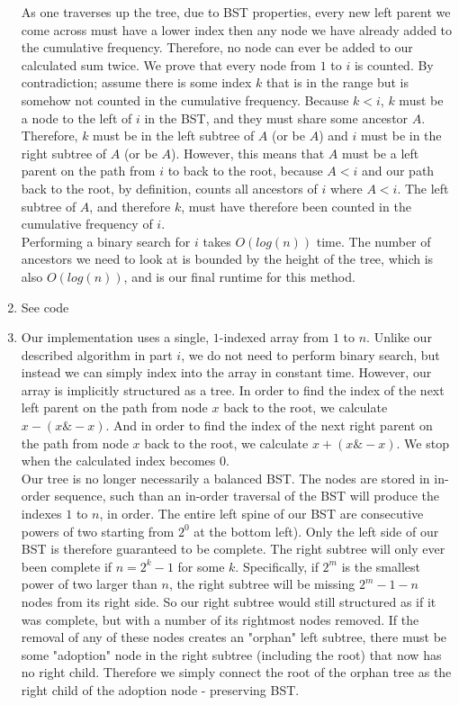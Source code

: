 \documentclass{article}
\theoremstyle{casestyle}
\begin{document}
\begin{enumerate}[i]
  As one traverses up the tree, due to BST properties, every new left parent we come across must have a lower index then any node we have already added to the cumulative frequency. Therefore, no node can ever be added to our calculated sum twice. We prove that every node from $1$ to $i$ is counted. By contradiction; assume there is some index $k$ that is in the range but is somehow not counted in the cumulative frequency. Because $k < i$, $k$ must be a node to the left of $i$ in the BST, and they must share some ancestor $A$. Therefore, $k$ must be in the left subtree of $A$ (or be $A$) and $i$ must be in the right subtree of $A$ (or be $A$). However, this means that $A$ must be a left parent on the path from $i$ to back to the root, because $A < i$ and our path back to the root, by definition, counts all ancestors of $i$ where $ A < i$. The left subtree of $A$, and therefore $k$, must have therefore been counted in the cumulative frequency of $i$.\\

  Performing a binary search for $i$ takes $O(log(n))$ time. The number of ancestors we need to look at is bounded by the height of the tree, which is also $O(log(n))$, and is our final runtime for this method.

\item
  See code

\item
  Our implementation uses a single, $1$-indexed array from $1$ to $n$. Unlike our described algorithm in part $i$, we do not need to perform binary search, but instead we can simply index into the array in constant time. However, our array is implicitly structured as a tree. In order to find the index of the next left parent on the path from node $x$ back to the root, we calculate $x - (x \& -x)$. And in order to find the index of the next right parent on the path from node $x$ back to the root, we calculate $x + (x \& -x)$. We stop when the calculated index becomes $0$. \\

  Our tree is no longer necessarily a balanced BST. The nodes are stored in in-order sequence, such than an in-order traversal of the BST will produce the indexes $1$ to $n$, in order. The entire left spine of our BST are consecutive powers of two starting from $2^0$ at the bottom left). Only the left side of our BST is therefore guaranteed to be complete. The right subtree will only ever been complete if $n = 2^k - 1$ for some $k$. Specifically, if $2^m$ is the smallest power of two larger than $n$, the right subtree will be missing $2^m - 1 - n$ nodes from its right side. So our right subtree would still structured as if it was complete, but with a number of its rightmost nodes removed. If the removal of any of these nodes creates an "orphan" left subtree, there must be some "adoption" node in the right subtree (including the root) that now has no right child. Therefore we simply connect the root of the orphan tree as the right child of the adoption node - preserving BST.\\


\end{enumerate}
\end{document}
